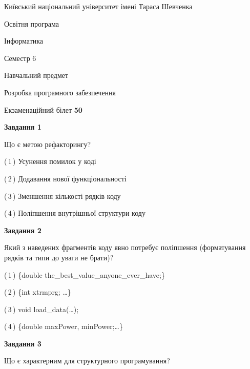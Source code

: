 \documentclass[10pt, ukrainian]{article}
\begin{document}
{{\begin {small}\par
{ \center  Київський національний університет імені Тараса Шевченка \par}
{\parbox {5 cm}{Освітня програма \hfill}{\parbox {7 cm}{Інформатика \hfill}}\parbox {6 cm}{\hfill Семестр 6}}\par
{\parbox {5 cm} {Навчальний предмет \hfill}\parbox {7 cm}{Розробка програмного забезпечення \hfill}\parbox {6cm}{\hfill}\par}\vspace{-7pt} \end{small}}{\center Екзаменаційний білет \No \textbf
{ 50 }\par}}
{
\begin {large}
{\begin {center}\textbf{Завдання 1}\end {center}}\par
Що є метою рефакторингу?\par
\vspace{2mm}



(\,1\,) Усунення помилок у коді%



(\,2\,) Додавання нової функціональності%



(\,3\,) Зменшення кількості рядків коду%



(\,4\,) Поліпшення внутрішньої структури коду%


{\begin {center}\textbf{Завдання 2}\end {center}}\par
Який з наведених фрагментів коду явно потребує поліпшення (форматування рядків та типи до уваги не брати)?\par
\vspace{2mm}



(\,1\,) \{double the\_best\_value\_anyone\_ever\_have;\} %



(\,2\,) \{int xtrmprg; …\}%



(\,3\,) void load\_data(…);%



(\,4\,) \{double maxPower, minPower;…\} %


{\begin {center}\textbf{Завдання 3}\end {center}}\par
Що є характерним для структурного програмування?\par
\vspace{2mm}




\end{large}}
\end{document}
